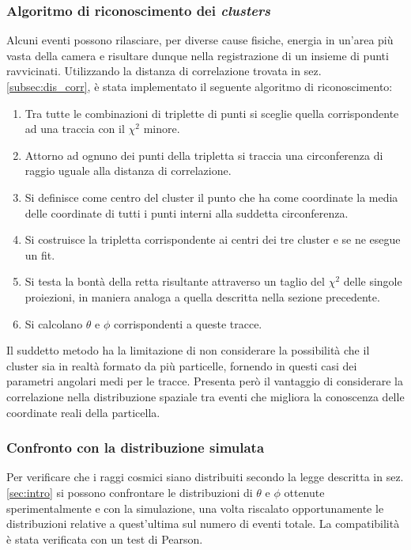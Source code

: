 \documentclass[8pt]{extarticle}
\begin{document}
\subsubsection{Algoritmo di riconoscimento dei \textit{clusters}} \label{subsubsec:clusters}
Alcuni eventi possono rilasciare, per diverse cause fisiche, energia in un'area più vasta della camera e risultare dunque nella registrazione di un insieme di punti ravvicinati.
Utilizzando la distanza di correlazione trovata in sez. \ref{subsec:dis_corr}, è stata implementato il seguente algoritmo di riconoscimento: \\
\begin{enumerate}
\item Tra tutte le combinazioni di triplette di punti si sceglie quella corrispondente ad una traccia con il $\chi^2$ minore.
\item Attorno ad ognuno dei punti della tripletta si traccia una circonferenza di raggio uguale alla distanza di correlazione.
\item Si definisce come centro del cluster il punto che ha come coordinate la media delle coordinate di tutti i punti interni alla suddetta circonferenza.
\item Si costruisce la tripletta corrispondente ai centri dei tre cluster e se ne esegue un fit.
\item Si testa la bontà della retta risultante attraverso un taglio del $\chi^2$ delle singole proiezioni, in maniera analoga a quella descritta nella sezione precedente.
\item Si calcolano $\theta$ e $\phi$ corrispondenti a queste tracce.
\end{enumerate}

Il suddetto metodo ha la limitazione di non considerare la possibilità che il cluster sia in realtà formato da più particelle, fornendo in questi casi dei parametri angolari medi per le tracce. Presenta però il vantaggio di considerare la correlazione nella distribuzione spaziale tra eventi che migliora la conoscenza delle coordinate reali della particella. 


\subsubsection{Confronto con la distribuzione simulata}
Per verificare che i raggi cosmici siano distribuiti secondo la legge descritta in sez. \ref{sec:intro} si possono confrontare le distribuzioni di $\theta$ e $\phi$ ottenute sperimentalmente e con la simulazione, una volta riscalato opportunamente le distribuzioni relative a quest'ultima sul numero di eventi totale. La compatibilità è stata verificata con un test di Pearson.
\end{document}
